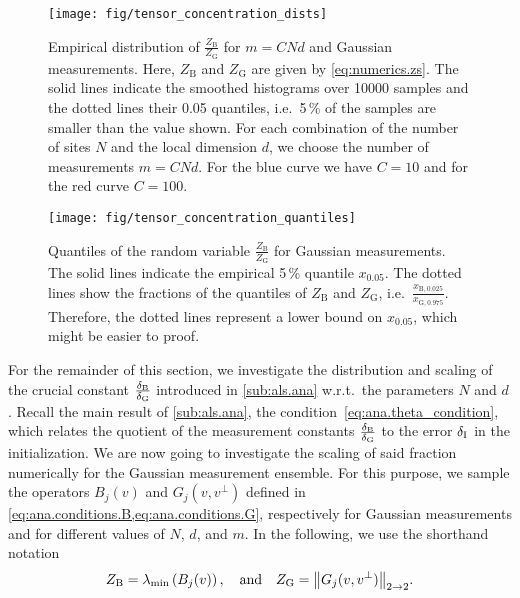 \begin{figure*}
  \texttt{[image: fig/tensor\_concentration\_dists]}
  \caption{%
    \label{fig:numerics.dists}%
    Empirical distribution of $\frac{Z_\mathrm{B}}{Z_\mathrm{G}}$ for $m = C N d$ and Gaussian measurements.
    Here, $Z_\mathrm{B}$ and $Z_\mathrm{G}$ are given by \cref{eq:numerics.zs}.
    The solid lines indicate the smoothed histograms over 10000 samples and the dotted lines their 0.05 quantiles, i.e.\ 5\,\% of the samples are smaller than the value shown.
    For each combination of the number of sites $N$ and the local dimension $d$, we choose the number of measurements $m = CNd$.
    For the blue curve we have $C = 10$ and for the red curve $C=100$.
  }
\end{figure*}
\begin{figure*}
  \texttt{[image: fig/tensor\_concentration\_quantiles]}
  \caption{%
    \label{fig:numerics.quantiles}%
    Quantiles of the random variable $\frac{Z_\mathrm{B}}{Z_\mathrm{G}}$ for Gaussian measurements.
    The solid lines indicate the empirical 5\,\% quantile $x_{0.05}$.
    The dotted lines show the fractions of the  quantiles of $Z_\mathrm{B}$ and $Z_\mathrm{G}$, i.e.\ $\frac{x_{\mathrm{B},0.025}}{x_{\mathrm{G},0.975}}$.
    Therefore, the dotted lines represent a lower bound on $x_{0.05}$, which might be easier to proof.
  }
\end{figure*}

For the remainder of this section, we investigate the distribution and scaling of the crucial constant $\frac{\delta_\mathrm{B}}{\delta_\mathrm{G}}$ introduced in \cref{sub:als.ana} w.r.t.\ the parameters $N$ and $d$ .
Recall the main result of \cref{sub:als.ana}, the condition~\eqref{eq:ana.theta_condition}, which relates the quotient of the measurement constants $\frac{\delta_\mathrm{B}}{\delta_\mathrm{G}}$ to the error $\delta_\mathrm{I}$ in the initialization.
We are now going to investigate the scaling of said fraction numerically for the Gaussian measurement ensemble.
For this purpose, we sample the operators $B_j(v)$ and $G_j(v, v^\perp)$ defined in \cref{eq:ana.conditions.B,eq:ana.conditions.G}, respectively for Gaussian measurements and for different values of $N$, $d$, and $m$.
In the following, we use the shorthand notation
\[
  \label{eq:numerics.zs}
  Z_\mathrm{B} = \lambda_\mathrm{min}\left(B_j(v)\right),
  \quad\mbox{and}\quad
  Z_\mathrm{G} = {\left\Vert G_j(v,v^\perp)\right\Vert}_{2 \to 2}.
\]

